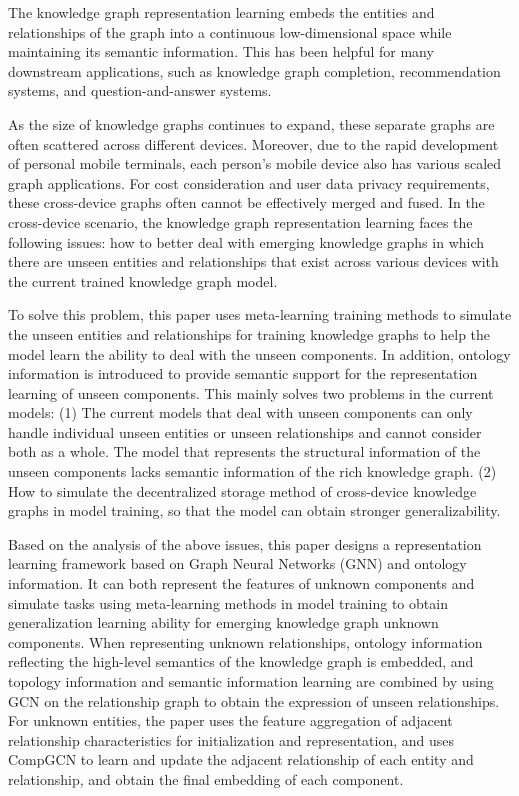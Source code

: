 
The knowledge graph representation learning embeds the entities and relationships of the graph into a continuous low-dimensional space while maintaining its semantic information. This has been helpful for many downstream applications, such as knowledge graph completion, recommendation systems, and question-and-answer systems.

As the size of knowledge graphs continues to expand, these separate graphs are often scattered across different devices. Moreover, due to the rapid development of personal mobile terminals, each person's mobile device also has various scaled graph applications. For cost consideration and user data privacy requirements, these cross-device graphs often cannot be effectively merged and fused. In the cross-device scenario, the knowledge graph representation learning faces the following issues: how to better deal with emerging knowledge graphs in which there are unseen entities and relationships that exist across various devices with the current trained knowledge graph model.

To solve this problem, this paper uses meta-learning training methods to simulate the unseen entities and relationships for training knowledge graphs to help the model learn the ability to deal with the unseen components. In addition, ontology information is introduced to provide semantic support for the representation learning of unseen components. This mainly solves two problems in the current models: (1) The current models that deal with unseen components can only handle individual unseen entities or unseen relationships and cannot consider both as a whole. The model that represents the structural information of the unseen components lacks semantic information of the rich knowledge graph. (2) How to simulate the decentralized storage method of cross-device knowledge graphs in model training, so that the model can obtain stronger generalizability.

Based on the analysis of the above issues, this paper designs a representation learning framework based on Graph Neural Networks (GNN) and ontology information. It can both represent the features of unknown components and simulate tasks using meta-learning methods in model training to obtain generalization learning ability for emerging knowledge graph unknown components. When representing unknown relationships, ontology information reflecting the high-level semantics of the knowledge graph is embedded, and topology information and semantic information learning are combined by using GCN on the relationship graph to obtain the expression of unseen relationships. For unknown entities, the paper uses the feature aggregation of adjacent relationship characteristics for initialization and representation, and uses CompGCN to learn and update the adjacent relationship of each entity and relationship, and obtain the final embedding of each component.


